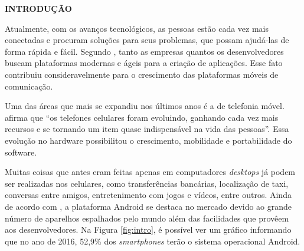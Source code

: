   \vspace{1.2em}
  \textbf{\large INTRODUÇÃO}
  \vspace{2.9em}
\thispagestyle{empty}


	\par Atualmente, com os avanços tecnológicos, as pessoas estão cada vez mais
conectadas e procuram soluções para seus problemas, que possam ajudá-las de
forma rápida e fácil.  Segundo , tanto as empresas
quantos os desenvolvedores buscam plataformas modernas e ágeis para a criação
de aplicações. Esse fato contribuiu consideravelmente para o crescimento das
plataformas móveis de comunicação.

	\par Uma das áreas que mais se expandiu nos últimos anos é a de telefonia
móvel.  afirma que “os telefones celulares foram
evoluindo, ganhando cada vez mais recursos e se tornando um item quase
indispensável na vida das pessoas”. Essa evolução no hardware possibilitou o
crescimento, mobilidade e portabilidade do software.

	\par Muitas coisas que antes eram feitas apenas em computadores
\textit{desktops} já podem ser realizadas nos celulares, como transferências
bancárias, localização de taxi, conversas entre amigos, entretenimento com
jogos e vídeos, entre outros. Ainda de acordo com , a
plataforma Android se destaca no mercado devido ao grande número de aparelhos
espalhados pelo mundo além das facilidades que provêem aos desenvolvedores. Na
Figura \ref{fig:intro}, é possível ver um gráfico informando que no ano de
2016, 52,9\% dos \textit{smartphones} terão o sistema operacional Android.

